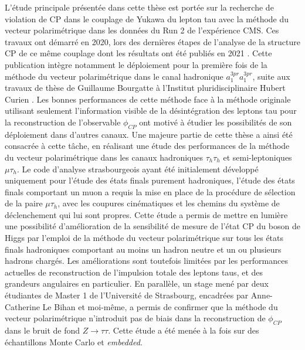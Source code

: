 
L'étude principale présentée dans cette thèse est portée sur la recherche de violation de CP dans le couplage de Yukawa du lepton tau avec la méthode du vecteur polarimétrique dans les données du Run 2 de l'expérience CMS. Ces travaux ont démarré en 2020, lors des dernières étapes de l'analyse de la structure CP de ce même couplage dont les résultats ont été publiés en 2021 \cite{Htautau}. Cette publication intègre notamment le déploiement pour la première fois de la méthode du vecteur polarimétrique dans le canal hadronique $a_1^{3pr}a_1^{3pr}$, suite aux travaux de thèse de Guillaume Bourgatte à l'Institut pluridisciplinaire Hubert Curien \cite{guigui}. Les bonnes performances de cette méthode face à la méthode originale utilisant seulement l'information visible de la désintégration des leptons tau pour la reconstruction de l'observable $\phi_{CP}$ ont motivé à étudier les possibilités de son déploiement dans d'autres canaux. Une majeure partie de cette thèse a ainsi été consacrée à cette tâche, en réalisant une étude des performances de la méthode du vecteur polarimétrique dans les canaux hadroniques $\tau_h\tau_h$ et semi-leptoniques $\mu\tau_h$. Le code d'analyse strasbourgeois ayant été initialement développé uniquement pour l'étude des états finals purement hadroniques, l'étude des états finals comportant un muon a requis la mise en place de la procédure de sélection de la paire $\mu\tau_h$, avec les coupures cinématiques et les chemins du système de déclenchement qui lui sont propres. Cette étude a permis de mettre en lumière une possibilité d'amélioration de la sensibilité de mesure de l'état CP du boson de Higgs par l'emploi de la méthode du vecteur polarimétrique sur tous les états finals hadroniques comportant au moins un hadron neutre et un ou plusieurs hadrons chargés. Les améliorations sont toutefois limitées par les performances actuelles de reconstruction de l'impulsion totale des leptons taus, et des grandeurs angulaires en particulier. En parallèle, un stage mené par deux étudiantes de Master 1 de l'Université de Strasbourg, encadrées par Anne-Catherine Le Bihan et moi-même, a permis de confirmer que la méthode du vecteur polarimétrique n'introduit pas de biais dans la reconstruction de $\phi_{CP}$ dans le bruit de fond $Z\to\tau\tau$. Cette étude a été menée à la fois sur des échantillons Monte Carlo et \textit{embedded}. \\

